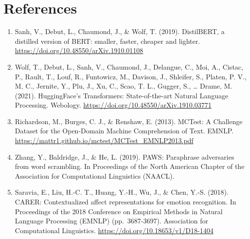 \documentclass[
  11pt,
]{article}
\begin{document}
\section{References}\label{references}

\begin{enumerate}
\def\labelenumi{\arabic{enumi}.}
\item
  Sanh, V., Debut, L., Chaumond, J., \& Wolf, T. (2019). DistilBERT, a
  distilled version of BERT: smaller, faster, cheaper and lighter.
  \url{https://doi.org/10.48550/arXiv.1910.01108}
\item
  Wolf, T., Debut, L., Sanh, V., Chaumond, J., Delangue, C., Moi, A.,
  Cistac, P., Rault, T., Louf, R., Funtowicz, M., Davison, J., Shleifer,
  S., Platen, P. V., M, C., Jernite, Y., Plu, J., Xu, C., Scao, T. L.,
  Gugger, S., \ldots{} Drame, M. (2021). HuggingFace's Transformers:
  State-of-the-art Natural Language Processing. Webology.
  \url{https://doi.org/10.48550/arXiv.1910.03771}
\item
  Richardson, M., Burges, C. J., \& Renshaw, E. (2013). MCTest: A
  Challenge Dataset for the Open-Domain Machine Comprehension of Text.
  EMNLP. \url{https://mattr1.github.io/mctest/MCTest_EMNLP2013.pdf}
\item
  Zhang, Y., Baldridge, J., \& He, L. (2019). PAWS: Paraphrase
  adversaries from word scrambling. In Proceedings of the North American
  Chapter of the Association for Computational Linguistics (NAACL).
\item
  Saravia, E., Liu, H.-C. T., Huang, Y.-H., Wu, J., \& Chen, Y.-S.
  (2018). CARER: Contextualized affect representations for emotion
  recognition. In Proceedings of the 2018 Conference on Empirical
  Methods in Natural Language Processing (EMNLP) (pp.~3687-3697).
  Association for Computational Linguistics.
  \url{https://doi.org/10.18653/v1/D18-1404}
\end{enumerate}
\end{document}
